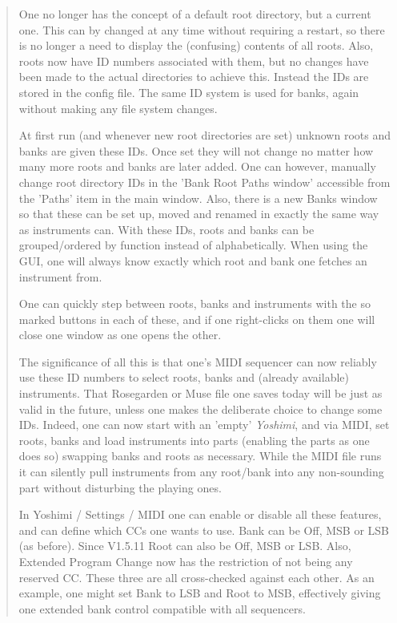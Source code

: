    \begin{quotation}
      One no longer has the concept of a default root directory, but a current
      one. This can by changed at any time without requiring a restart, so
      there is no longer a need to display the (confusing) contents of all
      roots. Also, roots now have ID numbers associated with them, but no
      changes have been made to the actual directories to achieve this. Instead
      the IDs are stored in the config file. The same ID system is used for
      banks, again without making any file system changes.

      At first run (and whenever new root directories are set) unknown roots
      and banks are given these IDs. Once set they will not change no matter
      how many more roots and banks are later added. One can however, manually
      change root directory IDs in the 'Bank Root Paths window' accessible from
      the 'Paths' item in the main window. Also, there is a new Banks window so
      that these can be set up, moved and renamed in exactly the same way as
      instruments can.  With these IDs, roots and banks can be grouped/ordered
      by function instead of alphabetically. When using the GUI, one will
      always know exactly which root and bank one fetches an instrument from.

      One can quickly step between roots, banks and instruments with the so
      marked buttons in each of these, and if one right-clicks on them one will
      close one window as one opens the other.

      The significance of all this is that one's MIDI sequencer can now
      reliably use these ID numbers to select roots, banks and (already
      available) instruments. That Rosegarden or Muse file one saves today will
      be just as valid in the future, unless one makes the deliberate choice to
      change some IDs. Indeed, one can now start with an 'empty'
      \textsl{Yoshimi}, and
      via MIDI, set roots, banks and load instruments into parts (enabling the
      parts as one does so) swapping banks and roots as necessary. While the
      MIDI file runs it can silently pull instruments from any root/bank into
      any non-sounding part without disturbing the playing ones.

      In Yoshimi / Settings / MIDI one can enable or disable all these features,
      and can define which CCs one wants to use. Bank can be Off, MSB or LSB
      (as before). Since V1.5.11 Root can also be Off, MSB or LSB.
      Also, Extended Program Change now has the restriction of not being any
      reserved CC. These three are all cross-checked against each other.
      As an example, one might set Bank to LSB and Root to MSB, effectively
      giving one extended bank control compatible with all sequencers.


\end{quotation}

